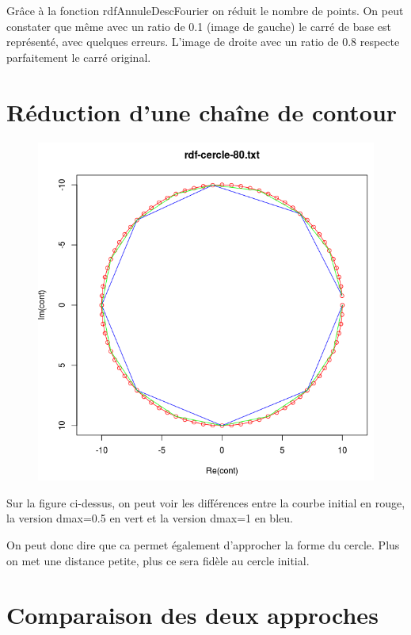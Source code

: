 \documentclass[a4paper,12pt]{report}
\begin{document}
Grâce à la fonction rdfAnnuleDescFourier on réduit le nombre de points. On peut constater que même avec un ratio de 0.1 (image de gauche) le carré de base est représenté, avec quelques erreurs. L'image de droite avec un ratio de 0.8 respecte parfaitement le carré original.

\newpage




\section*{Réduction d'une chaîne de contour}

\begin{figure}[!ht]
	\center
	\includegraphics[scale=0.5]{image/fourier5.png}
\end{figure}


Sur la figure ci-dessus, on peut voir les différences entre la courbe initial en rouge, la version dmax=0.5 en vert et la version dmax=1 en bleu.

On peut donc dire que ca permet également d'approcher la forme du cercle. Plus on met une distance petite, plus ce sera fidèle au cercle initial.

\newpage






\section*{Comparaison des deux approches}
\end{document}
